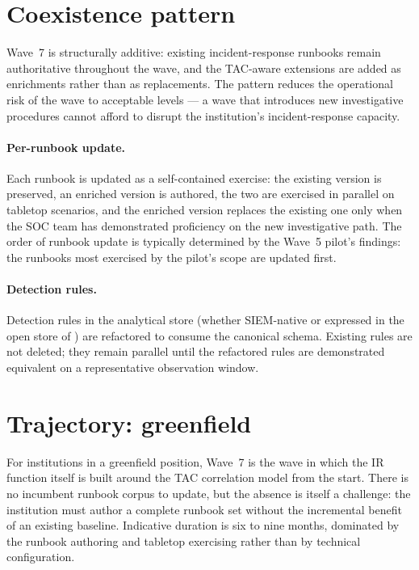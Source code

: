 \section{Coexistence pattern}
\label{sec:w7-coexistence}

Wave~7 is structurally additive: existing incident-response
runbooks remain authoritative throughout the wave, and the
TAC-aware extensions are added as enrichments rather than as
replacements. The pattern reduces the operational risk of the
wave to acceptable levels --- a wave that introduces new
investigative procedures cannot afford to disrupt the
institution's incident-response capacity.

\paragraph{Per-runbook update.} Each runbook is updated as a
self-contained exercise: the existing version is preserved, an
enriched version is authored, the two are exercised in parallel
on tabletop scenarios, and the enriched version replaces the
existing one only when the SOC team has demonstrated proficiency
on the new investigative path. The order of runbook update is
typically determined by the Wave~5 pilot's findings: the runbooks
most exercised by the pilot's scope are updated first.

\paragraph{Detection rules.} Detection rules in the analytical
store (whether SIEM-native or expressed in the open store of
) are refactored to consume the
canonical schema. Existing rules are not deleted; they remain
parallel until the refactored rules are demonstrated equivalent
on a representative observation window.

\section{Trajectory: greenfield}
\label{sec:w7-greenfield}

For institutions in a greenfield position, Wave~7 is the wave in
which the IR function itself is built around the TAC correlation
model from the start. There is no incumbent runbook corpus to
update, but the absence is itself a challenge: the institution
must author a complete runbook set without the incremental
benefit of an existing baseline. Indicative duration is six to
nine months, dominated by the runbook authoring and tabletop
exercising rather than by technical configuration.

